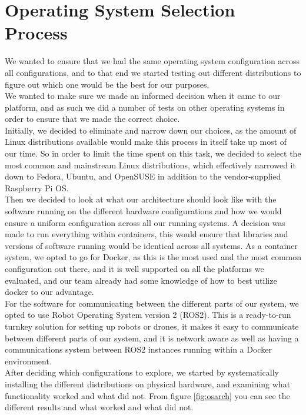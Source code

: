 \section{Operating System Selection Process}

We wanted to ensure that we had the same operating system configuration across all configurations, and to that end we started testing out different distributions to figure out which one would be the best for our purposes.\\

We wanted to make sure we made an informed decision when it came to our platform, and as such we did a number of tests on other operating systems in order to ensure that we made the correct choice.\\

Initially, we decided to eliminate and narrow down our choices, as the amount of Linux distributions available would make this process in itself take up most of our time. So in order to limit the time spent on this task, we decided to select the most common and mainstream Linux distributions, which effectively narrowed it down to Fedora, Ubuntu, and OpenSUSE in addition to the vendor-supplied Raspberry Pi OS. \\

Then we decided to look at what our architecture should look like with the software running on the different hardware configurations and how we would ensure a uniform configuration across all our running systems. A decision was made to run everything within containers, this would ensure that libraries and versions of software running would be identical across all systems. As a container system, we opted to go for Docker, as this is the most used and the most common configuration out there, and it is well supported on all the platforms we evaluated, and our team already had some knowledge of how to best utilize docker to our advantage.  \\

For the software for communicating between the different parts of our system, we opted to use Robot Operating System version 2 (ROS2). This is a ready-to-run turnkey solution for setting up robots or drones, it makes it easy to communicate between different parts of our system, and it is network aware as well as having a communications system between ROS2 instances running within a Docker environment.\\


After deciding which configurations to explore, we started by systematically installing the different distributions on physical hardware, and examining what functionality worked and what did not. From figure \ref{fig:osarch} you can see the different results and what worked and what did not. \\ 

